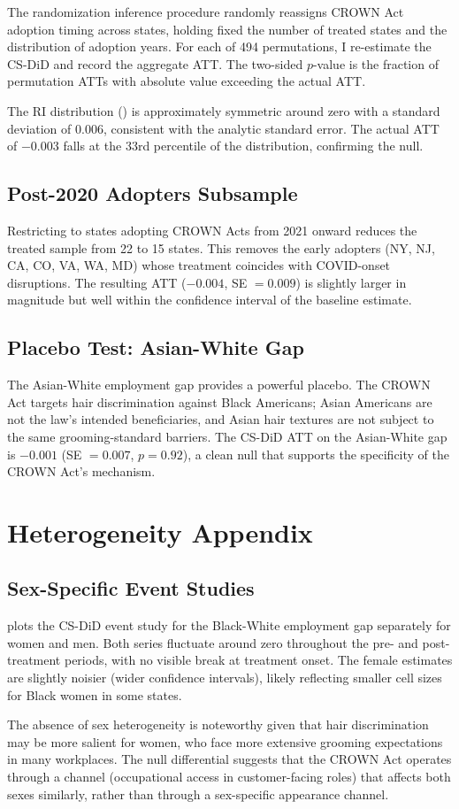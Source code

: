 \documentclass[12pt]{article}
\begin{document}
The randomization inference procedure randomly reassigns CROWN Act adoption timing across states, holding fixed the number of treated states and the distribution of adoption years. For each of 494 permutations, I re-estimate the CS-DiD and record the aggregate ATT. The two-sided $p$-value is the fraction of permutation ATTs with absolute value exceeding the actual ATT.

The RI distribution () is approximately symmetric around zero with a standard deviation of 0.006, consistent with the analytic standard error. The actual ATT of $-0.003$ falls at the 33rd percentile of the distribution, confirming the null.

\subsection{Post-2020 Adopters Subsample}

Restricting to states adopting CROWN Acts from 2021 onward reduces the treated sample from 22 to 15 states. This removes the early adopters (NY, NJ, CA, CO, VA, WA, MD) whose treatment coincides with COVID-onset disruptions. The resulting ATT ($-0.004$, SE $= 0.009$) is slightly larger in magnitude but well within the confidence interval of the baseline estimate.

\subsection{Placebo Test: Asian-White Gap}

The Asian-White employment gap provides a powerful placebo. The CROWN Act targets hair discrimination against Black Americans; Asian Americans are not the law's intended beneficiaries, and Asian hair textures are not subject to the same grooming-standard barriers. The CS-DiD ATT on the Asian-White gap is $-0.001$ (SE $= 0.007$, $p = 0.92$), a clean null that supports the specificity of the CROWN Act's mechanism.

\section{Heterogeneity Appendix}\label{app:heterogeneity}

\subsection{Sex-Specific Event Studies}

 plots the CS-DiD event study for the Black-White employment gap separately for women and men. Both series fluctuate around zero throughout the pre- and post-treatment periods, with no visible break at treatment onset. The female estimates are slightly noisier (wider confidence intervals), likely reflecting smaller cell sizes for Black women in some states.

The absence of sex heterogeneity is noteworthy given that hair discrimination may be more salient for women, who face more extensive grooming expectations in many workplaces. The null differential suggests that the CROWN Act operates through a channel (occupational access in customer-facing roles) that affects both sexes similarly, rather than through a sex-specific appearance channel.
\end{document}
